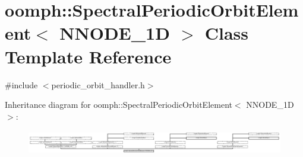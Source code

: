 \hypertarget{classoomph_1_1SpectralPeriodicOrbitElement}{}\section{oomph\+:\+:Spectral\+Periodic\+Orbit\+Element$<$ N\+N\+O\+D\+E\+\_\+1D $>$ Class Template Reference}
\label{classoomph_1_1SpectralPeriodicOrbitElement}


{\ttfamily \#include $<$periodic\+\_\+orbit\+\_\+handler.\+h$>$}

Inheritance diagram for oomph\+:\+:Spectral\+Periodic\+Orbit\+Element$<$ N\+N\+O\+D\+E\+\_\+1D $>$\+:\begin{figure}[H]
\begin{center}
\leavevmode
\includegraphics[height=1.090343cm]{classoomph_1_1SpectralPeriodicOrbitElement}
\end{center}
\end{figure}
